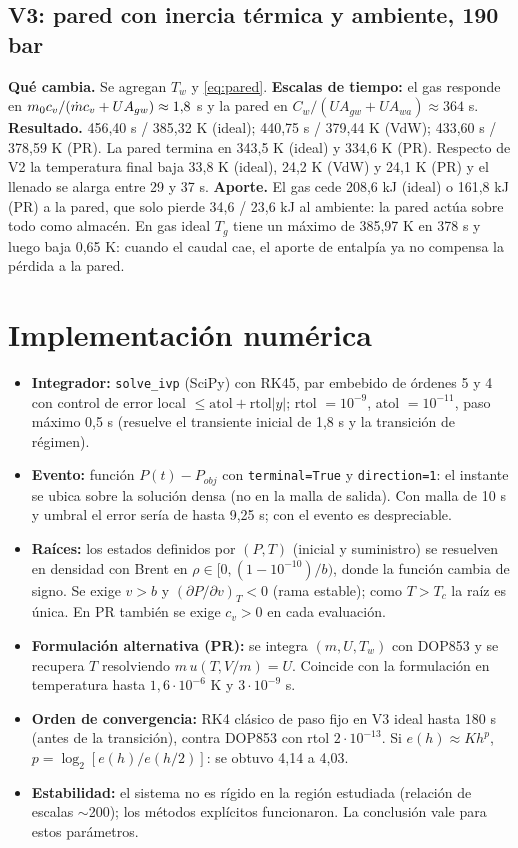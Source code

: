 \documentclass[11pt]{article}
\begin{document}
\subsection{V3: pared con inercia térmica y ambiente, 190 bar}
\textbf{Qué cambia.} Se agregan $T_w$ y \eqref{eq:pared}. \textbf{Escalas de tiempo:} el gas responde en
$m_0c_v/(\dot m c_v+UA_{gw})\approx1{,}8$ s y la pared en $C_w/(UA_{gw}+UA_{wa})\approx364$ s.
\textbf{Resultado.} 456,40 s / 385,32 K (ideal); 440,75 s / 379,44 K (VdW); 433,60 s / 378,59 K (PR).
La pared termina en 343,5 K (ideal) y 334,6 K (PR). Respecto de V2 la temperatura final baja 33,8 K (ideal),
24,2 K (VdW) y 24,1 K (PR) y el llenado se alarga entre 29 y 37 s.
\textbf{Aporte.} El gas cede 208,6 kJ (ideal) o 161,8 kJ (PR) a la pared, que solo pierde 34,6 / 23,6 kJ al ambiente:
la pared actúa sobre todo como almacén. En gas ideal $T_g$ tiene un máximo de 385,97 K en 378 s y luego baja
0,65 K: cuando el caudal cae, el aporte de entalpía ya no compensa la pérdida a la pared.

\section{Implementación numérica}
\begin{itemize}
\item \textbf{Integrador:} \texttt{solve\_ivp} (SciPy) con RK45, par embebido de órdenes 5 y 4 con control de error
local $\le \text{atol}+\text{rtol}|y|$; rtol $=10^{-9}$, atol $=10^{-11}$, paso máximo 0,5 s (resuelve el transiente
inicial de 1,8 s y la transición de régimen).
\item \textbf{Evento:} función $P(t)-P_{obj}$ con \texttt{terminal=True} y \texttt{direction=1}: el instante se ubica sobre
la solución densa (no en la malla de salida). Con malla de 10 s y umbral el error sería de hasta 9,25 s; con el evento es despreciable.
\item \textbf{Raíces:} los estados definidos por $(P,T)$ (inicial y suministro) se resuelven en densidad con Brent en
$\rho\in[0,(1-10^{-10})/b)$, donde la función cambia de signo. Se exige $v>b$ y $(\partial P/\partial v)_T<0$ (rama estable);
como $T>T_c$ la raíz es única. En PR también se exige $c_v>0$ en cada evaluación.
\item \textbf{Formulación alternativa (PR):} se integra $(m,U,T_w)$ con DOP853 y se recupera $T$ resolviendo $m\,u(T,V/m)=U$.
Coincide con la formulación en temperatura hasta $1{,}6\cdot10^{-6}$ K y $3\cdot10^{-9}$ s.
\item \textbf{Orden de convergencia:} RK4 clásico de paso fijo en V3 ideal hasta 180 s (antes de la transición),
contra DOP853 con rtol $2\cdot10^{-13}$. Si $e(h)\approx Kh^p$, $p=\log_2[e(h)/e(h/2)]$: se obtuvo 4,14 a 4,03.
\item \textbf{Estabilidad:} el sistema no es rígido en la región estudiada (relación de escalas $\sim$200); los métodos
explícitos funcionaron. La conclusión vale para estos parámetros.
\end{itemize}
\end{document}
